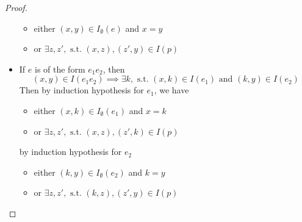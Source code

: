 \begin{proof}
\begin{itemize}
\begin{itemize}[nosep]
            \item either \((x, y) ∈ I_∅(e)\) and \(x = y\)
            \item or \(\exists z, z', \text{ s.t. } (x, z), (z', y) ∈ I(p)\)
        \end{itemize}
        \item If \(e\) is of the form \(e_1 e_2\),
        then 
        \[
            (x, y) ∈ I(e_1 e_2)
            ⟹ ∃ k, \text{ s.t. } (x, k) ∈ I(e_1)  \text{ and }  (k, y) ∈ I(e_2) 
        \]
        Then by induction hypothesis for \(e_1\), we have 
        \begin{itemize}[nosep]
            \item either \((x, k) ∈ I_∅(e_1)\) and \(x = k\)
            \item or \(\exists z, z', \text{ s.t. } (x, z), (z', k) ∈ I(p)\)
        \end{itemize}
        by induction hypothesis for \(e_2\)
        \begin{itemize}[nosep]
            \item either \((k, y) ∈ I_∅(e_2)\) and \(k = y\)
            \item or \(\exists z, z', \text{ s.t. } (k, z), (z', y) ∈ I(p)\)
        \end{itemize}
        

\end{itemize}
\end{proof}
